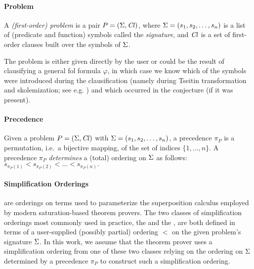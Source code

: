 

\paragraph{Problem}
A \emph{(first-order) problem} is a pair \(P = (\operatorname{\Sigma}, \operatorname{\mathit{Cl}})\),
where \(\operatorname{\Sigma} = (s_1, s_2, \ldots, s_n)\) is a list of (predicate and function) symbols called the \emph{signature},
and \(\operatorname{\mathit{Cl}}\) is a set of first-order
clauses built over the symbols of \(\operatorname{\Sigma}\).

The problem is either given directly by the user or 
could be the result of clausifying a general \gls*{fol} formula \(\varphi\),
in which case we know which of the symbols were introduced during the clausification
(namely during Tseitin transformation and skolemization; see e.g. \citet{DBLP:books/el/RV01/NonnengartW01})
and which occurred in the conjecture (if it was present).

\paragraph{Precedence}
Given a problem \(P = (\operatorname{\Sigma}, \operatorname{\mathit{Cl}})\) with \(\operatorname{\Sigma} = (s_1, s_2, \ldots, s_n)\),
a precedence \(\pi_P\) is a permutation, i.e.~a bijective mapping, of the set of indices \(\{1,\ldots,n\}\).
A precedence \(\pi_P\) \emph{determines} a (total) ordering on \(\operatorname{\Sigma}\) as follows:
\(s_{\pi_P(1)} < s_{\pi_P(2)} < \ldots < s_{\pi_P(n)}.\)

\paragraph{Simplification Orderings} are orderings on terms used to parameterize the superposition calculus \cite{Nieuwenhuis2001}
employed by modern saturation-based theorem provers. The two classes of simplification orderings most commonly used in practice,
the  \cite{Knuth1983} and the  \cite{Kamin1980}, are both defined in terms 
of a user-supplied (possibly partial) ordering $<$ %
on the given problem's signature \(\operatorname{\Sigma}\).
In this work, we assume that the theorem prover uses a simplification ordering from one of these two classes
relying on the ordering on \(\operatorname{\Sigma}\) determined by a precedence \(\pi_P\) to construct such a simplification ordering.

